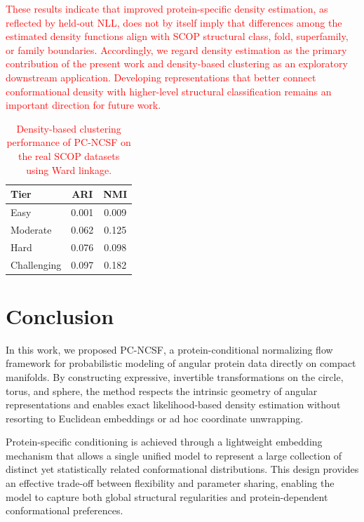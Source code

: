 \documentclass{article}
\begin{document}
\textcolor{red}{These results indicate that improved protein-specific density
estimation, as reflected by held-out NLL, does not by itself imply that
differences among the estimated density functions align with SCOP structural
class, fold, superfamily, or family boundaries. Accordingly, we regard density
estimation as the primary contribution of the present work and density-based
clustering as an exploratory downstream application. Developing representations
that better connect conformational density with higher-level structural
classification remains an important direction for future work.}

\begin{table}[h]
\centering
\caption{\textcolor{red}{Density-based clustering performance of PC-NCSF on
the real SCOP datasets using Ward linkage.}}
\label{tab:scop_clustering}

\color{red}
\begin{tabular}{lcc}
\toprule
Tier  & ARI & NMI \\
\midrule
Easy         & 0.001 & 0.009 \\
Moderate   & 0.062 & 0.125 \\
Hard       & 0.076 & 0.098 \\
Challenging  & 0.097 & 0.182 \\
\bottomrule
\end{tabular}
\color{black}

\end{table}

\section{Conclusion}

In this work, we proposed PC-NCSF, a protein-conditional normalizing flow framework for probabilistic modeling of angular protein data directly on compact manifolds. By constructing expressive, invertible transformations on the circle, torus, and sphere, the method respects the intrinsic geometry of angular representations and enables exact likelihood-based density estimation without resorting to Euclidean embeddings or ad hoc coordinate unwrapping.

Protein-specific conditioning is achieved through a lightweight embedding mechanism that allows a single unified model to represent a large collection of distinct yet statistically related conformational distributions. This design provides an effective trade-off between flexibility and parameter sharing, enabling the model to capture both global structural regularities and protein-dependent conformational preferences.
\end{document}
